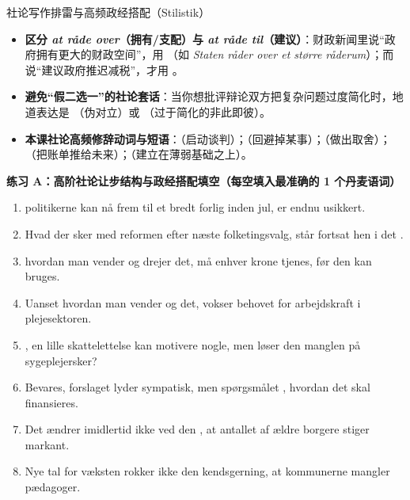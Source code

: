 \begin{grammatikbox}{社论写作排雷与高频政经搭配（Stilistik）}
\begin{itemize}
  \item \textbf{区分 \textit{at råde over}（拥有/支配）与 \textit{at råde til}（建议）}：财政新闻里说“政府拥有更大的财政空间”，用 （如 \textit{Staten råder over et større råderum}）；而说“建议政府推迟减税”，才用 。
  \item \textbf{避免“假二选一”的社论套话}：当你想批评辩论双方把复杂问题过度简化时，地道表达是 （伪对立）或 （过于简化的非此即彼）。
  \item \textbf{本课社论高频修辞动词与短语}：（启动谈判）；（回避掉某事）；（做出取舍）；（把账单推给未来）；（建立在薄弱基础之上）。
\end{itemize}
\end{grammatikbox}


\textbf{练习 A：高阶社论让步结构与政经搭配填空（每空填入最准确的 1 个丹麦语词）}
\begin{enumerate}
  \item \underline{\hspace{2.2cm}} politikerne kan nå frem til et bredt forlig inden jul, er endnu usikkert.
  \item Hvad der sker med reformen efter næste folketingsvalg, står fortsat hen i det \underline{\hspace{2.2cm}}.
  \item \underline{\hspace{2.2cm}} hvordan man vender og drejer det, må enhver krone tjenes, før den kan bruges.
  \item Uanset hvordan man vender og \underline{\hspace{2.2cm}} det, vokser behovet for arbejdskraft i plejesektoren.
  \item \underline{\hspace{2.2cm}}, en lille skattelettelse kan motivere nogle, men løser den manglen på sygeplejersker?
  \item Bevares, forslaget lyder sympatisk, men spørgsmålet \underline{\hspace{2.2cm}}, hvordan det skal finansieres.
  \item Det ændrer imidlertid ikke ved den \underline{\hspace{2.2cm}}, at antallet af ældre borgere stiger markant.
  \item Nye tal for væksten rokker ikke \underline{\hspace{2.2cm}} den kendsgerning, at kommunerne mangler pædagoger.
\end{enumerate}

